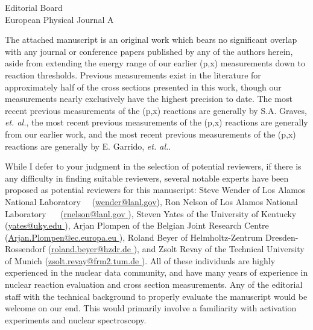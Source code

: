 \documentclass{letter} %
\begin{document}
\begin{letter}{
Editorial Board \\
European Physical Journal A}
 
\noindent The attached manuscript is an original work which bears no significant overlap with any journal or conference papers published by any of the authors herein, aside from extending the energy range of our earlier (p,x) measurements  down to reaction thresholds\footnotemark[9]. 
Previous measurements exist in the literature for approximately half of the cross sections presented in this work, though our measurements nearly exclusively have the highest precision to date.
The   most recent previous measurements of the (p,x) reactions are generally by S.A. Graves, \emph{et. al.}\footnotemark[11], the most recent previous measurements of the (p,x) reactions are generally from our earlier work\footnotemark[10], and the most recent previous measurements of the (p,x) reactions are generally by E. Garrido, \emph{et. al.}\footnotemark[12].

While I defer to your judgment in the selection of potential reviewers, if there is any difficulty in finding suitable reviewers, several notable experts have been proposed as potential reviewers for this manuscript: 
Steve Wender of Los Alamos National Laboratory  (\url{wender@lanl.gov}), Ron Nelson of Los Alamos National Laboratory  	   (\url{rnelson@lanl.gov	}), Steven Yates of the University of Kentucky	  (\url{yates@uky.edu	}), Arjan Plompen of the Belgian Joint Research Centre	   (\url{Arjan.Plompen@ec.europa.eu	}), Roland Beyer of Helmholtz-Zentrum Dresden-Rossendorf	  (\url{roland.beyer@hzdr.de	}), and Zsolt Revay of the Technical University of Munich	  (\url{zsolt.revay@frm2.tum.de	}).  All of these individuals are highly experienced in the nuclear data community, and have many years of experience in nuclear reaction evaluation and cross section measurements.
% 
Any of the editorial staff with the technical background to properly evaluate the manuscript would be welcome on our end.  This would primarily involve a familiarity with activation experiments and nuclear spectroscopy. 


\end{letter}
\end{document}
